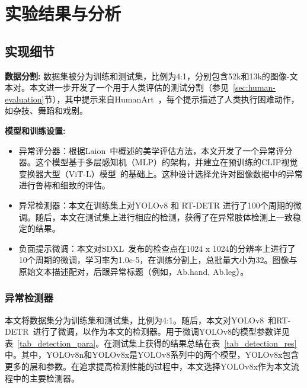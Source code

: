 \chapter{实验结果与分析}
\label{cha:usage-example}

\section{实现细节} \label{sec:implementation-details}
\textbf{数据分割:}
数据集被分为训练和测试集，比例为4:1，分别包含52k和13k的图像-文本对。本文进一步开发了一个用于人类评估的测试分割（参见~\ref{sec:human-evaluation}节），其中提示来自HumanArt~\cite{ju2023humanART}，每个提示描述了人类执行困难动作，如杂技、舞蹈和戏剧。

\textbf{模型和训练设置:}
\begin{itemize}
    \item 异常评分器：根据Laion~\cite{schuhmann2022laion}中概述的美学评估方法，本文开发了一个异常评分器。这个模型基于多层感知机（MLP）的架构，并建立在预训练的CLIP视觉变换器大型（ViT-L）模型~\cite{CLIP}的基础上。这种设计选择允许对图像数据中的异常进行鲁棒和细致的评估。
    \item 异常检测器：本文在训练集上对YOLOv8 \cite{yolo_redmon2016you} 和 RT-DETR \cite{lv2023detrs}进行了100个周期的微调。随后，本文在测试集上进行相应的检测，获得了在异常肢体检测上一致稳定的结果。
    \item 负面提示微调：本文对SDXL~\cite{SDXL}发布的检查点在1024 x 1024的分辨率上进行了10个周期的微调，学习率为1.0e-5，在训练分割上，总批量大小为32。图像与原始文本描述配对，后跟异常标题（例如，Ab.hand, Ab.leg）。
\end{itemize}

\subsection{异常检测器}
本文将数据集分为训练集和测试集，比例为4:1。随后，本文对YOLOv8~\cite{yolo_redmon2016you}和RT-DETR~\cite{lv2023detrs}进行了微调，以作为本文的检测器。用于微调YOLOv8的模型参数详见表~\ref{tab_detection_para}。在测试集上获得的结果总结在表~\ref{tab_detection_res}中。其中，YOLOv8n和YOLOv8x是YOLOv8系列中的两个模型，YOLOv8x包含更多的层和参数。在追求提高检测性能的过程中，本文选择YOLOv8x作为本文流程中的主要检测器。


